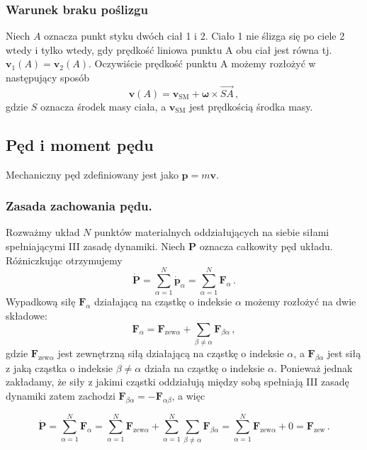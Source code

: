 \documentclass[../main.tex]{subfiles}
\begin{document}
\subsubsection*{Warunek braku poślizgu}
Niech \(A\) oznacza punkt styku dwóch ciał 1 i 2. Ciało 1 nie ślizga się po ciele 2 wtedy i tylko wtedy, gdy prędkość liniowa punktu A obu ciał jest równa tj. \(\mathbf{v}_1(A)=\mathbf{v}_2(A)\). Oczywiście prędkość punktu A możemy rozłożyć w następujący sposób
\begin{equation*}
    \mathbf{v}(A)=\mathbf{v}_\text{SM}+\boldsymbol{\omega}\times\overrightarrow{SA}\,,
\end{equation*}
gdzie \(S\) oznacza środek masy ciała, a \(\mathbf{v}_\text{SM}\) jest prędkością środka masy.

\subsection{Pęd i moment pędu}
Mechaniczny pęd zdefiniowany jest jako \(\mathbf{p}=m\mathbf{v}\).
\subsubsection{Zasada zachowania pędu.}
Rozważmy układ \(N\) punktów materialnych oddziałujących na siebie siłami spełniającymi III zasadę dynamiki. Niech \(\mathbf{P}\) oznacza całkowity pęd układu. Różniczkując otrzymujemy
\begin{equation*}
    \dot{\mathbf{P}}=\sum_{\alpha=1}^N\dot{\mathbf{p}}_\alpha=\sum_{\alpha=1}^N\mathbf{F}_\alpha\,.
\end{equation*}
Wypadkową siłę \(\mathbf{F}_\alpha\) działającą na cząstkę o indeksie \(\alpha\) możemy rozłożyć na dwie składowe: \begin{equation*}
    \mathbf{F}_\alpha=\mathbf{F}_{\text{zew}\alpha}+\sum_{\beta\neq\alpha}\mathbf{F}_{\beta\alpha}\,,
\end{equation*}
gdzie \(\mathbf{F}_{\text{zew}\alpha}\) jest zewnętrzną siłą działającą na cząstkę o indeksie \(\alpha\), a \(\mathbf{F}_{\beta\alpha}\) jest siłą z jaką cząstka o indeksie \(\beta\neq\alpha\) działa na cząstkę o indeksie \(\alpha\). Ponieważ jednak zakładamy, że siły z jakimi cząstki oddziałują między sobą spełniają III zasadę dynamiki zatem zachodzi \(\mathbf{F}_{\beta\alpha}=-\mathbf{F}_{\alpha\beta}\), a więc

\begin{equation*}
    \dot{\mathbf{P}}=\sum_{\alpha=1}^N\mathbf{F}_\alpha=\sum_{\alpha=1}^N\mathbf{F}_{\text{zew}\alpha}+\sum_{\alpha=1}^N\sum_{\beta\neq\alpha}\mathbf{F}_{\beta\alpha}=\sum_{\alpha=1}^N\mathbf{F}_{\text{zew}\alpha}+0=\mathbf{F}_\text{zew}\,.
\end{equation*}
\end{document}
